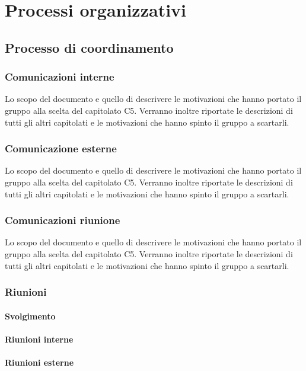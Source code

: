 \section{Processi organizzativi}

\subsection{Processo di coordinamento}
\subsubsection{Comunicazioni interne}
Lo scopo del documento e quello di descrivere le motivazioni che hanno portato il gruppo alla scelta del capitolato C5.
Verranno inoltre riportate le descrizioni di tutti gli altri capitolati e le motivazioni che hanno spinto il gruppo a scartarli.

\subsubsection{Comunicazione esterne}
Lo scopo del documento e quello di descrivere le motivazioni che hanno portato il gruppo alla scelta del capitolato C5.
Verranno inoltre riportate le descrizioni di tutti gli altri capitolati e le motivazioni che hanno spinto il gruppo a scartarli.

\subsubsection{Comunicazioni riunione}
Lo scopo del documento e quello di descrivere le motivazioni che hanno portato il gruppo alla scelta del capitolato C5.
Verranno inoltre riportate le descrizioni di tutti gli altri capitolati e le motivazioni che hanno spinto il gruppo a scartarli.

\subsubsection{Riunioni}

\paragraph{Svolgimento}

\paragraph{Riunioni interne}

\paragraph{Riunioni esterne}

